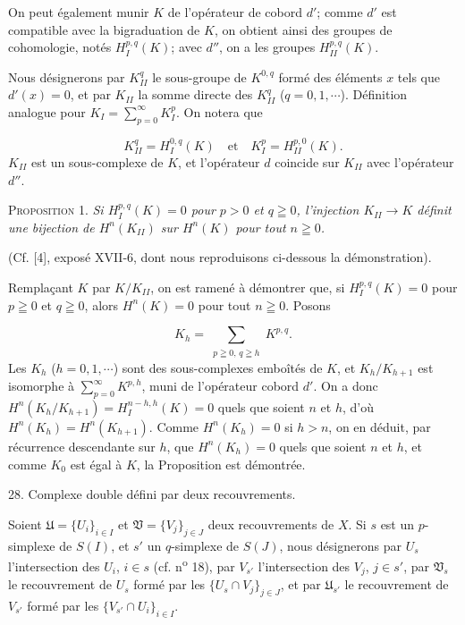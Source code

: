 On peut également munir $K$ de l'opérateur de cobord $d'$; comme $d'$ est compatible avec la bigraduation de $K$, on obtient ainsi des groupes de cohomologie, notés $H_I^{p,q}(K)$; avec $d''$, on a les groupes $H_{II}^{p,q}(K)$.

Nous désignerons par $K_{II}^q$ le sous-groupe de $K^{0,q}$ formé des éléments $x$ tels que $d'(x) = 0$, et par $K_{II}$ la somme directe des $K_{II}^q$ ($q = 0, 1, \cdots$). Définition analogue pour $K_I = \sum_{p=0}^{\infty} K_I^p$. On notera que

\begin{equation*}
K_{II}^q = H_I^{0,q}(K) \quad \text{et} \quad K_I^p = H_{II}^{p,0}(K).
\end{equation*}
$K_{II}$ est un sous-complexe de $K$, et l'opérateur $d$ coincide sur $K_{II}$ avec l'opérateur $d''$.



\textsc{Proposition} 1. \textit{Si $H_I^{p,q}(K) = 0$ pour $p > 0$ et $q \geqq 0$, l'injection $K_{II} \to K$ définit une bijection de $H^n(K_{II})$ sur $H^n(K)$ pour tout $n \geqq 0$.}

(Cf. [4], exposé XVII-6, dont nous reproduisons ci-dessous la démonstration).

Remplaçant $K$ par $K/K_{II}$, on est ramené à démontrer que, si $H_I^{p,q}(K) = 0$ pour $p \geqq 0$ et $q \geqq 0$, alors $H^n(K) = 0$ pour tout $n \geqq 0$. Posons

\begin{equation*}
K_h = \sum_{\substack{p \geqq 0,\,q \geqq h}} K^{p,q}.
\end{equation*}
Les $K_h$ ($h = 0, 1, \cdots$) sont des sous-complexes emboîtés de $K$, et $K_h/K_{h+1}$ est isomorphe à $\sum_{p=0}^{\infty} K^{p,h}$, muni de l'opérateur cobord $d'$. On a donc $H^n(K_h/K_{h+1}) = H_I^{n-h,h}(K) = 0$ quels que soient $n$ et $h$, d'où $H^n(K_h) = H^n(K_{h+1})$. Comme $H^n(K_h) = 0$ si $h > n$, on en déduit, par récurrence descendante sur $h$, que $H^n(K_h) = 0$ quels que soient $n$ et $h$, et comme $K_0$ est égal à $K$, la Proposition est démontrée.


28. Complexe double défini par deux recouvrements.

Soient $\mathfrak{U} = \{U_i\}_{i \in I}$ et $\mathfrak{V} = \{V_j\}_{j \in J}$ deux recouvrements de $X$. Si $s$ est un $p$-simplexe de $S(I)$, et $s'$ un $q$-simplexe de $S(J)$, nous désignerons par $U_s$ l'intersection des $U_i$, $i \in s$ (cf. n\textsuperscript{o} 18), par $V_{s'}$ l'intersection des $V_j$, $j \in s'$, par $\mathfrak{V}_s$ le recouvrement de $U_s$ formé par les $\{U_s \cap V_j\}_{j \in J}$, et par $\mathfrak{U}_{s'}$ le recouvrement de $V_{s'}$ formé par les $\{V_{s'} \cap U_i\}_{i \in I}$.

